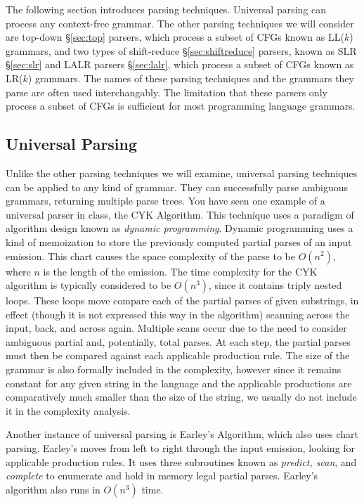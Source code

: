 \documentclass[a4paper, 10pt]{article}
\begin{document}
The following section introduces parsing techniques. Universal parsing can process any context-free grammar. The other parsing techniques we will consider are top-down \S \ref{sec:top} parsers, which process a subset of CFGs known as LL($k$) grammars, and two types of shift-reduce \S \ref{sec:shiftreduce} parsers, known as SLR \S \ref{sec:slr} and LALR parsers \S \ref{sec:lalr}, which process a subset of CFGs known as LR($k$) grammars. The names of these parsing techniques and the grammars they parse are often used interchangably. The limitation that these parsers only process a subset of CFGs is sufficient for most programming language grammars.
\subsection{Universal Parsing}
Unlike the other parsing techniques we will examine, universal parsing techniques can be applied to any kind of grammar. They can successfully parse ambiguous grammars, returning multiple parse trees. You have seen one example of a universal parser in class, the CYK Algorithm. This technique uses a paradigm of algorithm design known as \emph{dynamic programming}. Dynamic programming uses a kind of memoization to store the previously computed partial parses of an input emission. This chart causes the space complexity of the parse to be $O(n^2)$, where $n$ is the length of the emission. The time complexity for the CYK algorithm is typically considered to be $O(n^3)$, since it contains triply nested loops. These loops move compare each of the partial parses of given substrings, in effect (though it is not expressed this way in the algorithm) scanning across the input, back, and across again. Multiple scans occur due to the need to consider ambiguous partial and, potentially, total parses. At each step, the partial parses must then be compared against each applicable production rule. The size of the grammar is also formally included in the complexity, however since it remains constant for any given string in the language and the applicable productions are comparatively much smaller than the size of the string, we usually do not include it in the complexity analysis. 

Another instance of universal parsing is Earley's Algorithm, which also uses chart parsing. Earley's moves from left to right through the input emission, looking for applicable production rules. It uses three subroutines known as \emph{predict, scan}, and \emph{complete} to enumerate and hold in memory legal partial parses. Earley's algorithm also runs in $O(n^3)$ time. 
\end{document}
